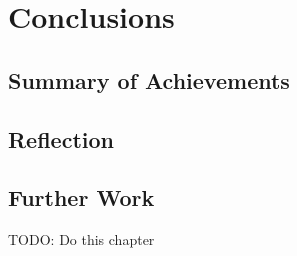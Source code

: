 \chapter{Conclusions}
\label{cha:evaluation}
\section{Summary of Achievements}

\section{Reflection}
\section{Further Work}


TODO: Do this chapter
